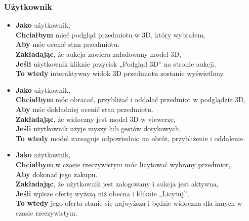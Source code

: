 \subsubsection{Użytkownik}
\begin{itemize}
    \item \textbf{Jako} użytkownik,\\
          \textbf{Chciałbym} mieć podgląd przedmiotu w 3D, który wybrałem,\\
          \textbf{Aby} móc ocenić stan przedmiotu.\\
          \textbf{Zakładając}, że aukcja zawiera załadowany model 3D, \\
          \textbf{Jeśli} użytkownik kliknie przycisk „Podgląd 3D” na stronie aukcji, \\
          \textbf{To wtedy} interaktywny widok 3D przedmiotu zostanie wyświetlony.\\

    \item \textbf{Jako} użytkownik,\\
          \textbf{Chciałbym} móc obracać, przybliżać i oddalać przedmiot w podglądzie 3D,\\
          \textbf{Aby} móc dokładniej ocenić stan przedmiotu.\\
          \textbf{Zakładając}, że widoczny jest model 3D w viewerze,\\
          \textbf{Jeśli} użytkownik użyje myszy lub gestów dotykowych,\\
          \textbf{To wtedy} model zareaguje odpowiednio na obrót, przybliżenie i oddalenie.\\


    \item \textbf{Jako} użytkownik,\\
          \textbf{Chciałbym} w czasie rzeczywistym móc licytować wybrany przedmiot,\\
          \textbf{Aby} dokonać jego zakupu.\\
          \textbf{Zakładając}, że użytkownik jest zalogowany i aukcja jest aktywna,\\
          \textbf{Jeśli} wpisze ofertę wyższą niż obecna i kliknie „Licytuj”,\\
          \textbf{To wtedy} jego oferta stanie się najwyższą i będzie widoczna dla innych w czasie rzeczywistym.\\


\end{itemize}
